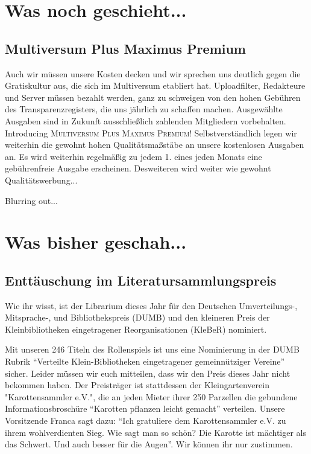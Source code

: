 \documentclass[final]{multiversum}
\begin{document}
\makemultititle
%


\section{Was noch geschieht...}

\subsection{Multiversum Plus Maximus Premium}
Auch wir müssen unsere Kosten decken und wir sprechen uns deutlich gegen die Gratiskultur aus, die sich im Multiversum etabliert hat. 
Uploadfilter, Redakteure und Server müssen bezahlt werden, ganz zu schweigen von den hohen Gebühren des Transparenzregisters, die uns jährlich zu schaffen machen.
Ausgewählte Ausgaben sind in Zukunft ausschließlich zahlenden Mitgliedern vorbehalten.
Introducing \textsc{Multiversum Plus Maximus Premium!}
Selbstverständlich legen wir weiterhin die gewohnt hohen Qualitätsmaßstäbe an unsere kostenlosen Ausgaben an.
Es wird weiterhin regelmäßig zu jedem 1. eines jeden Monats eine gebührenfreie Ausgabe erscheinen.
Desweiteren wird weiter wie gewohnt Qualitätswerbung...

Blurring out...

\section{Was bisher geschah...}

\subsection{Enttäuschung im Literatursammlungspreis}
Wie ihr wisst, ist der Librarium dieses Jahr für den Deutschen Umverteilungs-, Mitsprache-, und Bibliothekspreis (DUMB) 
und den kleineren Preis der Kleinbibliotheken eingetragener Reorganisationen (KleBeR) nominiert.

Mit unseren 246 Titeln des Rollenspiels ist uns eine Nominierung in der DUMB Rubrik \enquote{Verteilte Klein-Bibliotheken eingetragener gemeinnütziger Vereine} sicher.
Leider müssen wir euch mitteilen, dass wir den Preis dieses Jahr nicht bekommen haben.
Der Preisträger ist stattdessen der Kleingartenverein "Karottensammler e.V.", die an jeden Mieter ihrer 250 Parzellen die gebundene Informationsbroschüre \enquote{Karotten pflanzen leicht gemacht} verteilen.
Unsere Vorsitzende Franca sagt dazu: \enquote{Ich gratuliere dem Karottensammler e.V. zu ihrem wohlverdienten Sieg. 
Wie sagt man so schön? Die Karotte ist mächtiger als das Schwert. Und auch besser für die Augen}.
Wir können ihr nur zustimmen.
\end{document}
